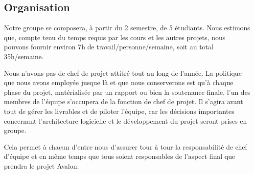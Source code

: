 \subsection{Organisation}

Notre groupe se composera, à partir du 2 semestre, de 5 étudiants. Nous estimons que, compte tenu du temps requis par les cours et les autres projets, nous pouvons fournir environ 7h de travail/personne/semaine, soit au total 35h/semaine. \newline

Nous n'avons pas de chef de projet attitré tout au long de l'année. La politique que nous avons employée jusque là et que nous conserverons est qu'à chaque phase du projet, matérialisée par un rapport ou bien la soutenance finale, l'un des membres de l'équipe s'occupera de la fonction de chef de projet. Il s'agira avant tout de gérer les livrables et de piloter l'équipe, car les décisions importantes concernant l'architecture logicielle et le développement du projet seront prises en groupe.\newline

Cela permet à chacun d'entre nous d'assurer tour à tour la responsabilité de chef d'équipe et en même temps que tous soient responsables de l'aspect final que prendra le projet Avalon. 